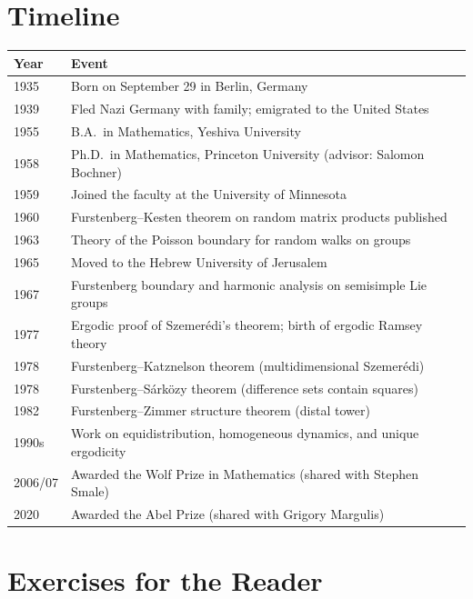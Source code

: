\section*{Timeline}
\begin{tabularx}{\linewidth}{|p{1.5cm}|>{\raggedright\arraybackslash}X|}
\hline
\textbf{Year} & \textbf{Event} \\ \hline
1935 & Born on September 29 in Berlin, Germany \\ \hline
1939 & Fled Nazi Germany with family; emigrated to the United States \\ \hline
1955 & B.A.\ in Mathematics, Yeshiva University \\ \hline
1958 & Ph.D.\ in Mathematics, Princeton University (advisor: Salomon Bochner) \\ \hline
1959 & Joined the faculty at the University of Minnesota \\ \hline
1960 & Furstenberg--Kesten theorem on random matrix products published \\ \hline
1963 & Theory of the Poisson boundary for random walks on groups \\ \hline
1965 & Moved to the Hebrew University of Jerusalem \\ \hline
1967 & Furstenberg boundary and harmonic analysis on semisimple Lie groups \\ \hline
1977 & Ergodic proof of Szemer\'edi's theorem; birth of ergodic Ramsey theory \\ \hline
1978 & Furstenberg--Katznelson theorem (multidimensional Szemer\'edi) \\ \hline
1978 & Furstenberg--S\'ark\"ozy theorem (difference sets contain squares) \\ \hline
1982 & Furstenberg--Zimmer structure theorem (distal tower) \\ \hline
1990s & Work on equidistribution, homogeneous dynamics, and unique ergodicity \\ \hline
2006/07 & Awarded the Wolf Prize in Mathematics (shared with Stephen Smale) \\ \hline
2020 & Awarded the Abel Prize (shared with Grigory Margulis) \\ \hline
\end{tabularx}

\section*{Exercises for the Reader}

